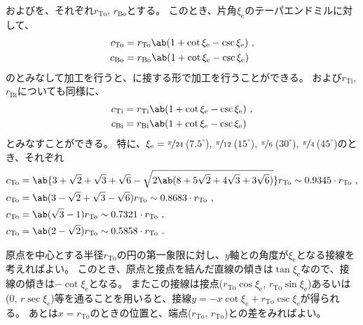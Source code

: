 \TopEndFaceOutRChamferRadius および\BottomEndFaceOutRChamferRadius を、それぞれ$r_\mathrm{To}$, $r_\mathrm{Bo}$とする。
このとき、片角$\xi_\mathrm e$のテーパエンドミルに対して、
\begin{align*}
  c_\mathrm{To} &= r_\mathrm{To}\ab(1+\cot\xi_\mathrm e-\csc\xi_\mathrm e)\ ,\\
  c_\mathrm{Bo} &= r_\mathrm{Bo}\ab(1+\cot\xi_\mathrm e-\csc\xi_\mathrm e)
\end{align*}
の\EndFaceOutCChamferLength とみなして加工を行うと、\EndFaceRChamfer に接する形で加工を行うことができる。
\TopEndFaceInRChamferRadius および\BottomEndFaceInRChamferRadius$r_\mathrm{Ti}$, $r_\mathrm{Bi}$についても同様に、
\begin{align*}
  c_\mathrm{Ti} &= r_\mathrm{Ti}\ab(1+\cot\xi_\mathrm e-\csc\xi_\mathrm e)\ ,\\
  c_\mathrm{Bi} &= r_\mathrm{Bi}\ab(1+\cot\xi_\mathrm e-\csc\xi_\mathrm e)
\end{align*}
とみなすことができる。
特に、$\xi_\mathrm e = \nicefrac\pi{24}$\,($7.5^\circ$), $\nicefrac\pi{12}$\,($15^\circ$), $\nicefrac\pi6$\,($30^\circ$), $\nicefrac\pi4$\,($45^\circ$)のとき、それぞれ
\begin{align*}
  c_\mathrm{To} &= \ab\{3+\sqrt2+\sqrt3+\sqrt6-\sqrt{2\ab(8+5\sqrt2+4\sqrt3+3\sqrt6)}\}r_\mathrm{To} \sim 0.9345\cdot r_\mathrm{To}\ ,\\
  c_\mathrm{To} &= \ab(3-\sqrt2+\sqrt3-\sqrt6)r_\mathrm{To} \sim 0.8683\cdot r_\mathrm{To}\ ,\\
  c_\mathrm{To} &= \ab(\sqrt3-1)r_\mathrm{To} \sim 0.7321\cdot r_\mathrm{To}\ ,\\
  c_\mathrm{To} &= \ab(2-\sqrt2)r_\mathrm{To} \sim 0.5858\cdot r_\mathrm{To}\ .
\end{align*}
\begin{hosoku}
原点を中心とする半径$r_\mathrm{To}$の円の第一象限に対し、$y$軸との角度が$\xi_\mathrm e$となる接線を考えればよい。
このとき、原点と接点を結んだ直線の傾きは$\tan\xi_\mathrm e$なので、接線の傾きは$-\cot\xi_\mathrm e$となる。
またこの接線は接点($r_\mathrm{To}\cos\xi_\mathrm e$, $r_\mathrm{To}\sin\xi_\mathrm e$)あるいは(0, $r\sec\xi_\mathrm e$)等を通ることを用いると、接線$y = -x\cot\xi_\mathrm e+r_\mathrm{To}\csc\xi_\mathrm e$が得られる。
あとは$x = r_\mathrm{To}$のときの位置と、端点($r_\mathrm{To}$, $r_\mathrm{To}$)との差をみればよい。
\end{hosoku}



